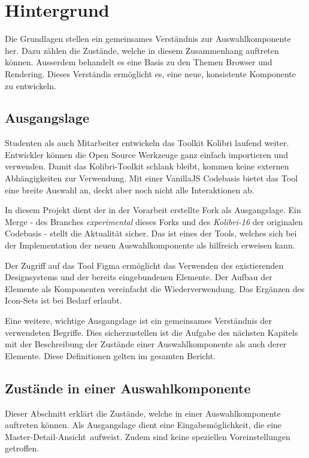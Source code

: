 \chapter{Hintergrund}
\label{chap:background}

Die Grundlagen stellen ein gemeinsames Verständnis zur Auswahlkomponente her.
Dazu zählen die Zustände, welche in diesem Zusammenhang auftreten können.
Ausserdem behandelt es eine Basis zu den Themen Browser und Rendering. 
Dieses Verständis ermöglicht es, eine neue, konsistente Komponente zu entwickeln.


\section{Ausgangslage}
\label{sec:basics}

Studenten als auch Mitarbeiter entwickeln das Toolkit Kolibri laufend weiter.
Entwickler können die Open Source Werkzeuge ganz einfach importieren und verwenden.
Damit das Kolibri-Toolkit schlank bleibt, kommen keine externen Abhängigkeiten zur Verwendung.
Mit einer VanillaJS Codebasis bietet das Tool eine breite Auswahl an, deckt aber noch nicht alle Interaktionen ab.

In diesem Projekt dient der in der Vorarbeit erstellte Fork als Ausgangslage.
Ein Merge - des Branches \emph{experimental} dieses Forks und des \emph{Kolibri-16} der originalen Codebasis - stellt die Aktualität sicher.
Das  ist eines der Tools, welches sich bei der Implementation der neuen Auswahlkomponente als hilfreich erweisen kann.

Der Zugriff auf das Tool Figma ermöglicht das Verwenden des existierenden Designsystems und der bereits eingebundenen Elemente. 
Der Aufbau der Elemente als Komponenten vereinfacht die Wiederverwendung. 
Das Ergänzen des Icon-Sets ist bei Bedarf erlaubt.

Eine weitere, wichtige Ausgangslage ist ein gemeinsames Verständnis der verwendeten Begriffe. 
Dies sicherzustellen ist die Aufgabe des nächsten Kapitels mit der Beschreibung der Zustände einer Auswahlkomponente als auch derer Elemente.
Diese Definitionen gelten im gesamten Bericht.


\section{Zustände in einer Auswahlkomponente}
\label{sec:states}

Dieser Abschnitt erklärt die Zustände, welche in einer Auswahlkomponente auftreten können.
Als Ausgangslage dient eine Eingabemöglichkeit, die eine Master-Detail-Ansicht\footnotemark \ aufweist.
Zudem sind keine speziellen Voreinstellungen getroffen.

